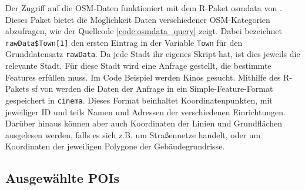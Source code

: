 \documentclass[a4paper,12pt]{thesis}
\begin{document}
Der Zugriff auf die OSM-Daten funktioniert mit dem R-Paket \glqq{}osmdata\grqq{}  von \cite{Padgham2017}. Dieses Paket bietet die Möglichkeit Daten verschiedener OSM-Kategorien abzufragen, wie der Quellcode \ref{code:osmdata_query} zeigt. Dabei bezeichnet \lstinline|rawData$Town[1]| den ersten Eintrag in der Variable \lstinline|Town| für den Grunddatensatz \lstinline|rawData|. Da jede Stadt ihr eigenes Skript hat, ist dies jeweils die relevante Stadt. Für diese Stadt wird eine Anfrage gestellt, die bestimmte Features erfüllen muss. Im Code Beispiel werden Kinos gesucht. Mithilfe des R-Pakets \glqq{}sf\grqq{} von \cite{Pebesma2018} werden die Daten der Anfrage in ein Simple-Feature-Format gespeichert in \lstinline|cinema|. Dieses Format beinhaltet Koordinatenpunkten, mit jeweiliger ID und teils Namen und Adressen der verschiedenen Einrichtungen. Darüber hinaus können aber auch Koordinaten der Linien und Grundflächen ausgelesen werden, falls es sich z.B. um Straßennetze handelt, oder um Koordinaten der jeweiligen Polygone der Gebäudegrundrisse.


\subsection{Ausgewählte POIs}
\end{document}
